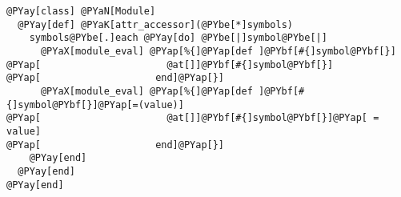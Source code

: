 \begin{Verbatim}[commandchars=@\[\]]
@PYay[class] @PYaN[Module]
  @PYay[def] @PYaK[attr_accessor](@PYbe[*]symbols)
    symbols@PYbe[.]each @PYay[do] @PYbe[|]symbol@PYbe[|]
      @PYaX[module_eval] @PYap[%{]@PYap[def ]@PYbf[#{]symbol@PYbf[}]
@PYap[                      @at[]]@PYbf[#{]symbol@PYbf[}]
@PYap[                    end]@PYap[}]
      @PYaX[module_eval] @PYap[%{]@PYap[def ]@PYbf[#{]symbol@PYbf[}]@PYap[=(value)]
@PYap[                      @at[]]@PYbf[#{]symbol@PYbf[}]@PYap[ = value]
@PYap[                    end]@PYap[}]
    @PYay[end]
  @PYay[end]
@PYay[end]
\end{Verbatim}
